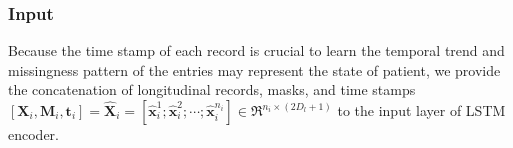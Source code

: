 \subsubsection{Input}
Because the time stamp of each record is crucial to learn the temporal trend and missingness pattern of the entries may represent the state of patient, we provide the concatenation of longitudinal records, masks, and time stamps $[\mathbf{X}_i, \mathbf{M}_i, \mathbf{t}_i] = \hat{\mathbf{X}}_i = [\hat{\mathbf{x}}_i^1; \hat{\mathbf{x}}_i^2; \cdots; \hat{\mathbf{x}}_i^{n_i}] \in \Re^{n_i \times (2 D_l + 1)}$ to the input layer of LSTM encoder. 

